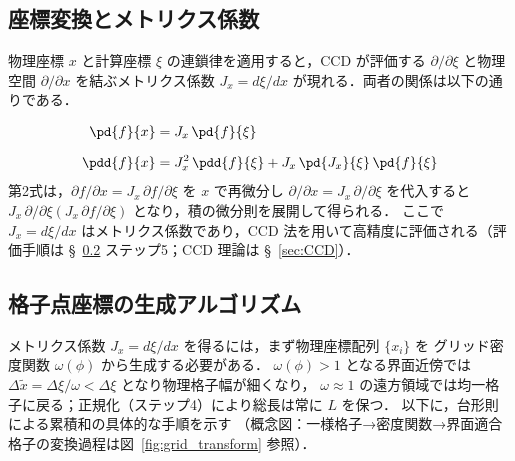 \subsection{座標変換とメトリクス係数}
\label{sec:grid_coord}

物理座標 $x$ と計算座標 $\xi$ の連鎖律を適用すると，CCD が評価する $\partial/\partial\xi$ と物理空間 $\partial/\partial x$ を結ぶメトリクス係数 $J_x = d\xi/dx$ が現れる．両者の関係は以下の通りである．

\begin{align}
 \pd{f}{x} &= J_x\,\pd{f}{\xi}
 \label{eq:transform_1st_correct} \\[6pt]
 \pdd{f}{x} &= J_x^2\,\pdd{f}{\xi} + J_x\,\pd{J_x}{\xi}\,\pd{f}{\xi}
 \label{eq:transform_2nd_correct}
\end{align}
第2式は，$\partial f/\partial x = J_x\,\partial f/\partial\xi$ を $x$ で再微分し $\partial/\partial x = J_x\,\partial/\partial\xi$ を代入すると $J_x\,\partial/\partial\xi(J_x\,\partial f/\partial\xi)$ となり，積の微分則を展開して得られる．
ここで $J_x = d\xi/dx$ はメトリクス係数であり，CCD 法を用いて高精度に評価される（評価手順は §~\ref{sec:grid_gen} ステップ5；CCD 理論は §~\ref{sec:CCD}）．

\subsection{格子点座標の生成アルゴリズム}
\label{sec:grid_gen}

メトリクス係数 $J_x = d\xi/dx$ を得るには，まず物理座標配列 $\{x_i\}$ を
グリッド密度関数 $\omega(\phi)$ から生成する必要がある．
$\omega(\phi) > 1$ となる界面近傍では $\Delta\tilde{x} = \Delta\xi/\omega < \Delta\xi$ となり物理格子幅が細くなり，
$\omega \approx 1$ の遠方領域では均一格子に戻る；正規化（ステップ4）により総長は常に $L$ を保つ．
以下に，台形則による累積和の具体的な手順を示す
（概念図：一様格子→密度関数→界面適合格子の変換過程は図~\ref{fig:grid_transform} 参照）．

